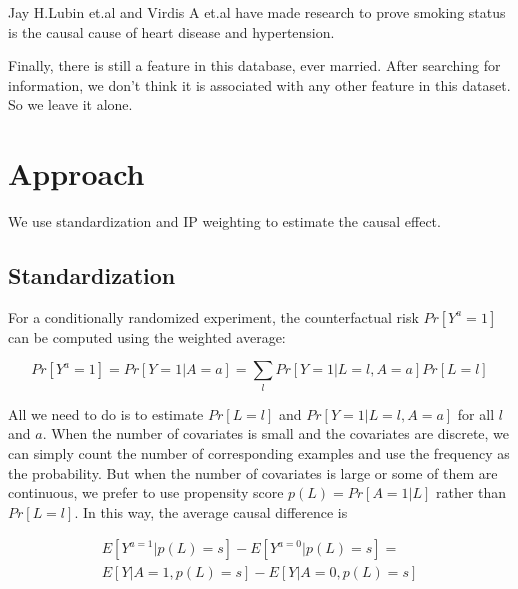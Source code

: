 \documentclass[letterpaper,12pt]{article}
\begin{document}
Jay H.Lubin et.al\cite{lubin2016risk} and Virdis A et.al\cite{virdis2010cigarette} have made research to prove smoking status is the causal cause of heart disease and hypertension.\par

Finally, there is still a feature in this database, ever married. After searching for information, we don’t think it is associated with any other feature in this dataset. So we leave it alone.\par



\section{Approach}

We use standardization and IP weighting to estimate the causal effect.
\subsection{Standardization}
For a conditionally randomized experiment, the counterfactual risk $Pr[Y^{a}=1]$ can be computed using the weighted average:

\begin{footnotesize}
\begin{equation}
Pr[Y^{a}=1] = Pr[Y=1|A=a] = \sum_{l}Pr[Y=1|L=l,A=a]Pr[L=l]
\end{equation}
\end{footnotesize}


All we need to do is to estimate $Pr[L=l]$ and $Pr[Y=1|L=l,A=a]$ for all $l$ and $a$. When the number of covariates is small and the covariates are discrete, we can simply count the number of corresponding examples and use the frequency as the probability. But when the number of covariates is large or some of them are continuous, we prefer to use propensity score $p(L)=Pr[A=1|L]$ rather than $Pr[L=l]$. In this way, the average causal difference is 

\begin{footnotesize}
\begin{equation}
\begin{split}
E[Y^{a=1}|p(L)=s]-E[Y^{a=0}|p(L)=s]= \\
E[Y|A=1,p(L)=s]-E[Y|A=0,p(L)=s]
\end{split}
\end{equation}
\end{footnotesize}
\end{document}
